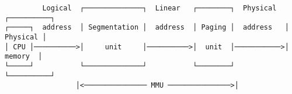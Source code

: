 \documentclass[varwidth=55em]{standalone}
\begin{document}
\begin{verbatim}
         Logical  ┌──────────────┐  Linear   ┌────────┐  Physical  ┌──────────┐
┌─────┐  address  │ Segmentation │  address  │ Paging │  address   │ Physical │
│ CPU │──────────>│     unit     │──────────>│  unit  │───────────>│  memory  │
└─────┘           └──────────────┘           └────────┘            └──────────┘
                 │<─────────────── MMU ───────────────>│
\end{verbatim}
\end{document}
